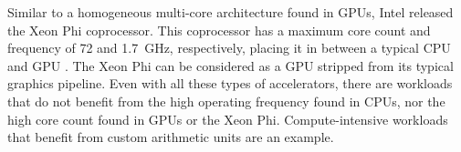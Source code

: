 
Similar to a homogeneous multi-core architecture found in GPUs, Intel released the Xeon Phi coprocessor. This coprocessor has a maximum core count and frequency of 72 and \SI{1.7}{\giga\hertz}, respectively, placing it in between a typical CPU and GPU \cite{phi}. The Xeon Phi can be considered as a GPU stripped from its typical graphics pipeline. Even with all these types of accelerators, there are workloads that do not benefit from the high operating frequency found in CPUs, nor the high core count found in GPUs or the Xeon Phi. Compute-intensive workloads that benefit from custom arithmetic units are an example.








